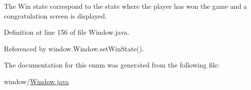 The Win state correspond to the state where the player has won the game and a congratulation screen is displayed. 



Definition at line 156 of file Window.\-java.



Referenced by window.\-Window.\-set\-Win\-State().



The documentation for this enum was generated from the following file\-:\begin{DoxyCompactItemize}
\item 
window/\hyperlink{_window_8java}{Window.\-java}\end{DoxyCompactItemize}
